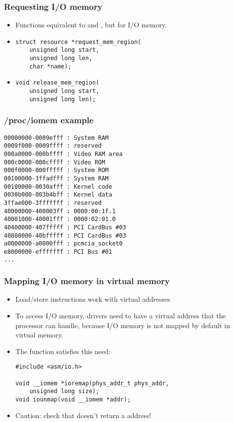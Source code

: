 \begin{frame}[fragile]
  \frametitle{Requesting I/O memory}
  \begin{itemize}
  \item Functions equivalent to  and
    , but for I/O memory.
  \item
\begin{verbatim}
struct resource *request_mem_region(
    unsigned long start,
    unsigned long len,
    char *name);
\end{verbatim}
  \item
\begin{verbatim}
void release_mem_region(
    unsigned long start,
    unsigned long len);
  \end{verbatim}
\end{itemize}
\end{frame}

\begin{frame}[fragile]
  \frametitle{/proc/iomem example}
{\small
\begin{verbatim}
00000000-0009efff : System RAM
0009f000-0009ffff : reserved
000a0000-000bffff : Video RAM area
000c0000-000cffff : Video ROM
000f0000-000fffff : System ROM
00100000-3ffadfff : System RAM
00100000-0030afff : Kernel code
0030b000-003b4bff : Kernel data
3ffae000-3fffffff : reserved
40000000-400003ff : 0000:00:1f.1
40001000-40001fff : 0000:02:01.0
40400000-407fffff : PCI CardBus #03
40800000-40bfffff : PCI CardBus #03
a0000000-a0000fff : pcmcia_socket0
e8000000-efffffff : PCI Bus #01
...
\end{verbatim}
}
\end{frame}

\begin{frame}[fragile]
  \frametitle{Mapping I/O memory in virtual memory}
  \begin{itemize}
  \item Load/store instructions work with virtual addresses
  \item To access I/O memory, drivers need to have a virtual address
    that the processor can handle, because I/O memory is not mapped by
    default in virtual memory.
  \item The  function satisfies this need:
\begin{verbatim}
#include <asm/io.h>

void __iomem *ioremap(phys_addr_t phys_addr,
    unsigned long size);
void iounmap(void __iomem *addr);
\end{verbatim}
  \item Caution: check that  doesn't return a  address!
  \end{itemize}
\end{frame}

